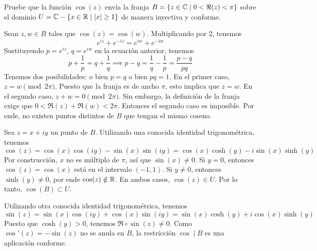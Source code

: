 \begin{exercise}
Pruebe que la función $\cos(z)$ envía la franja $B = \{ z \in \mathbb C \mid 0 < \Re(z) < \pi \}$ sobre el dominio $U = \mathbb C - \{ x \in \mathbb R \mid |x| \ge 1 \}$ de manera inyectiva y conforme.
\end{exercise}

\begin{solution}
Sean $z, w \in B$ tales que $\cos(z) = \cos(w)$. Multiplicando por $2$, tenemos
$$e^{iz} + e^{-iz} = e^{iw} + e^{-iw}$$
Sustituyendo $p = e^{iz}$, $q = e^{iw}$ en la ecuación anterior, tenemos
$$p + \frac 1p = q + \frac 1q \implies p-q = \frac 1q - \frac 1p = \frac {p-q} {pq}$$
Tenemos dos posibilidades: o bien $p = q$ o bien $pq = 1$. En el primer caso, $z = w \pmod {2\pi}$. Puesto que la franja es de ancho $\pi$, esto implica que $z = w$. En el segundo caso, $z + w = 0 \pmod {2\pi}$. Sin embargo, la definición de la franja exige que $0 < \Re(z) + \Re(w) < 2\pi$. Entonces el segundo caso es imposible. Por ende, no existen puntos distintos de $B$ que tengan el mismo coseno.

Sea $z = x + iy$ un punto de $B$. Utilizando una conocida identidad trigonométrica, tenemos
$$\cos(z) = \cos(x) \cos(iy) - \sin(x) \sin(iy) = \cos(x) \cosh(y) - i \sin(x) \sinh(y)$$
Por construcción, $x$ no es múltiplo de $\pi$, así que $\sin(x) \ne 0$. Si $y = 0$, entonces $\cos(z) = \cos(x)$ está en el intervalo $(-1, 1)$. Si $y \ne 0$, entonces $\sinh(y) \ne 0$, por ende $\cos(z) \notin \mathbb R$. En ambos casos, $\cos(z) \in U$. Por lo tanto, $\cos(B) \subset U$.

Utilizando otra conocida identidad trigonométrica, tenemos
$$\sin(z) = \sin(x) \cos(iy) + \cos(x) \sin(iy) = \sin(x) \cosh(y) + i \cos(x) \sinh(y)$$
Puesto que $\cosh(y) > 0$, tenemos $\Re \circ \sin(z) \ne 0$. Como $\cos'(z) = -\sin(z)$ no se anula en $B$, la restricción $\cos \mid B$ es una aplicación conforme.
\end{solution}
